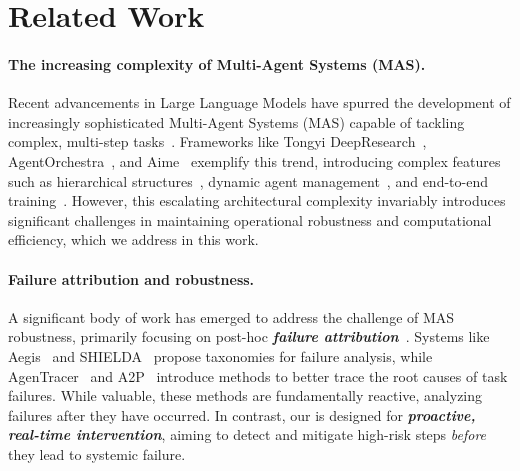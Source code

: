 \section{Related Work}

\paragraph{The increasing complexity of Multi-Agent Systems (MAS).}
Recent advancements in Large Language Models have spurred the development of increasingly sophisticated Multi-Agent Systems (MAS) capable of tackling complex, multi-step tasks~\citep{tran2025multiagentcollaborationmechanismssurvey,he2025llm}.
Frameworks like Tongyi DeepResearch~\citep{tongyidr}, AgentOrchestra~\citep{zhang2025agentorchestrahierarchicalmultiagentframework}, and Aime~\citep{shi2025aimefullyautonomousmultiagentframework} exemplify this trend, introducing complex features such as hierarchical structures~\citep{zhu2025oagentsempiricalstudybuilding,cheng2025hawkhierarchicalworkflowframework}, dynamic agent management~\citep{wu2025talkrightspecialistsrouting,zhang2025webpilot}, and end-to-end training~\citep{li2025chainofagentsendtoendagentfoundation,ye2025masgpttrainingllmsbuild}.
However, this escalating architectural complexity invariably introduces significant challenges in maintaining operational robustness and computational efficiency, which we address in this work.

\paragraph{Failure attribution and robustness.}
A significant body of work has emerged to address the challenge of MAS robustness, primarily focusing on post-hoc \textbf{\emph{failure attribution}}~\citep{zhang2025agentcausestaskfailures}.
Systems like Aegis~\citep{song2025aegistaxonomyoptimizationsovercoming} and SHIELDA~\citep{zhou2025shieldastructuredhandlingexceptions} propose taxonomies for failure analysis, while AgenTracer~\citep{zhang2025agentracerinducingfailurellm} and A2P~\citep{west2025abductactpredictscaffolding} introduce methods to better trace the root causes of task failures.
While valuable, these methods are fundamentally reactive, analyzing failures after they have occurred.
In contrast, our \method is designed for \textbf{\emph{proactive, real-time intervention}}, aiming to detect and mitigate high-risk steps \emph{before} they lead to systemic failure.


